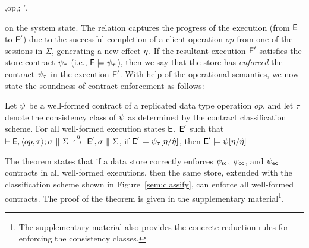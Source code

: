 \vspace{-1em}
\begin{smathpar}
  \auxred{} {\E,\langle op,\tau \rangle;\sigma \pll \Sigma} {\eff}
    {\E',\sigma \pll \Sigma}
\end{smathpar}

\noindent on the system state. The relation captures the progress of the
execution (from ${\normalfont \textsf{E}}$ to ${\normalfont \textsf{E}}'$)  due to the successful completion of a client
operation $\mathit{op}$ from one of the sessions in $\Sigma$, generating a new
effect $\eta$. If the resultant execution ${\normalfont \textsf{E}}'$ satisfies the store contract
$\psi_\tau$ (i.e., ${\normalfont \textsf{E}} \models \psi_\tau$), then we say that the store has
\emph{enforced} the contract $\psi_\tau$ in the execution ${\normalfont \textsf{E}}'$. With help of
the operational semantics, we now state the soundness of contract enforcement
as follows:

\begin{theorem}
\label{thm:classification-sound}
Let $\psi$ be a well-formed contract of a replicated data type operation
$\mathit{op}$, and let $\tau$ denote the consistency class of $\psi$ as
determined by the contract classification scheme. For all well-formed execution
states ${\normalfont \textsf{E}}$, ${\normalfont \textsf{E}}'$ such that
$\vdash {\normalfont \textsf{E}},\langle op,\tau \rangle;\sigma ~\|~ \Sigma \;\xhookrightarrow{\eta}\; {\normalfont \textsf{E}}', \sigma
~\|~ \Sigma$, if ${\normalfont \textsf{E}}' \models \psi_\tau[\eta/\hat{\eta}]$, then ${\normalfont \textsf{E}}' \models
\psi[\eta/\hat{\eta}]$
\end{theorem}

The theorem states that if a data store correctly enforces $\psi_{\sf sc}$, $\psi_{\sf cc}$, and
$\psi_{\sf ec}$ contracts in all well-formed executions, then the same store, extended
with the classification scheme shown in Figure~\ref{sem:classify}, can enforce
all well-formed \name contracts. The proof of the theorem is given in the
supplementary material\footnote{The supplementary material also provides the
concrete reduction rules for enforcing the consistency classes.}.
